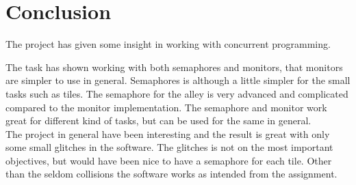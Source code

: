 \section{Conclusion}
The project has given some insight in working with concurrent programming. 

The task has shown working with both semaphores and monitors, that monitors are simpler to use in general. Semaphores is although a little simpler for the small tasks such as tiles. The semaphore for the alley is very advanced and complicated compared to the monitor implementation. The semaphore and monitor work great for different kind of tasks, but can be used for the same in general.
\\

The project in general have been interesting and the result is great with only some small glitches in the software. The glitches is not on the most important objectives, but would have been nice to have a semaphore for each tile. Other than the seldom collisions the software works as intended from the assignment.